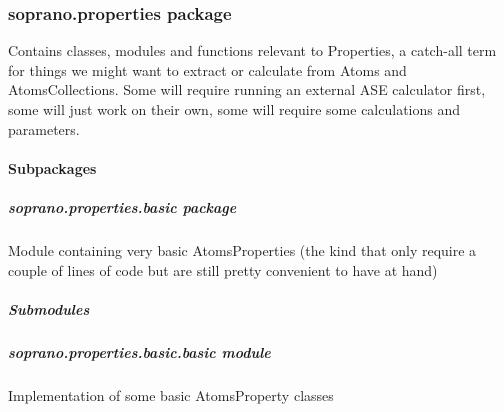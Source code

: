 \documentclass[letterpaper,10pt,english]{sphinxmanual}
\begin{document}
\subsubsection{soprano.properties package}
\label{doctree/soprano.properties:module-soprano.properties}\label{doctree/soprano.properties:soprano-properties-package}\label{doctree/soprano.properties::doc}
Contains classes, modules and functions relevant to Properties,
a catch-all term for things we might want to extract or calculate from
Atoms and AtomsCollections. Some will require running an external ASE
calculator first, some will just work on their own, some will require
some calculations and parameters.


\paragraph{Subpackages}
\label{doctree/soprano.properties:subpackages}

\subparagraph{soprano.properties.basic package}
\label{doctree/soprano.properties.basic:soprano-properties-basic-package}\label{doctree/soprano.properties.basic::doc}\label{doctree/soprano.properties.basic:module-soprano.properties.basic}
Module containing very basic AtomsProperties (the kind that only require
a couple of lines of code but are still pretty convenient to have at hand)


\subparagraph{Submodules}
\label{doctree/soprano.properties.basic:submodules}

\subparagraph{soprano.properties.basic.basic module}
\label{doctree/soprano.properties.basic.basic::doc}\label{doctree/soprano.properties.basic.basic:module-soprano.properties.basic.basic}\label{doctree/soprano.properties.basic.basic:soprano-properties-basic-basic-module}
Implementation of some basic AtomsProperty classes
\end{document}
